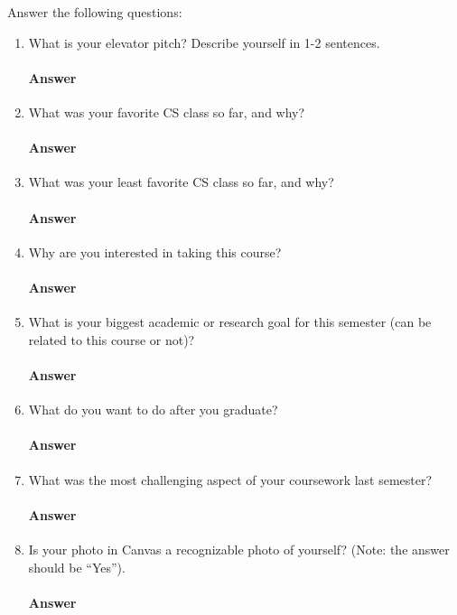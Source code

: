 \documentclass{article}
\begin{document}
Answer the following questions:
\begin{enumerate}
    \item What is your elevator pitch?  Describe yourself in 1-2
                sentences.

        \paragraph{Answer} \todo{}

     \item What was your favorite CS class so far, and why?

         \paragraph{Answer} \todo{}

     \item What was your least favorite CS class so far, and why?

         \paragraph{Answer} \todo{}

     \item Why are you interested in taking this course?

         \paragraph{Answer} \todo{}

     \item What is your biggest academic or research goal for this semester (can
         be related to this course or not)?

         \paragraph{Answer} \todo{}

     \item What do you want to do after you graduate?

         \paragraph{Answer} \todo{}

     \item What was the most challenging aspect of your coursework last semester?

         \paragraph{Answer} \todo{}

    \item Is your photo in Canvas a recognizable photo of yourself?  (Note: the
        answer should be ``Yes'').

         \paragraph{Answer} \todo{}

\end{enumerate}
\end{document}
